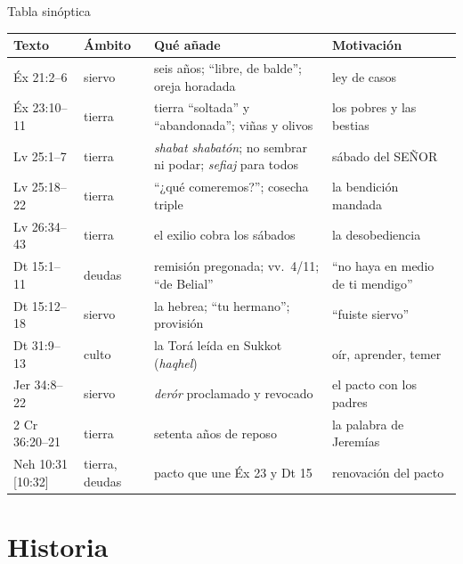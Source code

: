 \documentclass[hyperref={bookmarks=false},aspectratio=169]{beamer}
\newcommand{\SENOR}{S{\fontsize{0.78em}{1em}\selectfont EÑOR}}
\begin{document}
\begin{frame}{Tabla sinóptica}
\fontsize{6.3}{7.5}\selectfont\renewcommand{\arraystretch}{1.1}
\begin{tabular}{@{}L{1.9cm}L{1.3cm}L{5.6cm}L{3.1cm}@{}}
\toprule
\textbf{Texto} & \textbf{Ámbito} & \textbf{Qué añade} & \textbf{Motivación} \\ \midrule
Éx 21:2--6 & siervo & seis años; ``libre, de balde''; oreja horadada & ley de casos \\
Éx 23:10--11 & tierra & tierra ``soltada'' y ``abandonada''; viñas y olivos & los pobres y las bestias \\
Lv 25:1--7 & tierra & \emph{shabat shabatón}; no sembrar ni podar; \emph{sefiaj} para todos & sábado del \SENOR{} \\
Lv 25:18--22 & tierra & ``¿qué comeremos?''; cosecha triple & la bendición mandada \\
Lv 26:34--43 & tierra & el exilio cobra los sábados & la desobediencia \\
Dt 15:1--11 & deudas & remisión pregonada; vv.~4/11; ``de Belial'' & ``no haya en medio de ti mendigo'' \\
Dt 15:12--18 & siervo & la hebrea; ``tu hermano''; provisión & ``fuiste siervo'' \\
Dt 31:9--13 & culto & la Torá leída en Sukkot (\emph{haqhel}) & oír, aprender, temer \\
Jer 34:8--22 & siervo & \emph{derór} proclamado y revocado & el pacto con los padres \\
2 Cr 36:20--21 & tierra & setenta años de reposo & la palabra de Jeremías \\
Neh 10:31 [10:32] & tierra, deudas & pacto que une Éx 23 y Dt 15 & renovación del pacto \\
\bottomrule
\end{tabular}
\end{frame}

\section{Historia}
\end{document}

